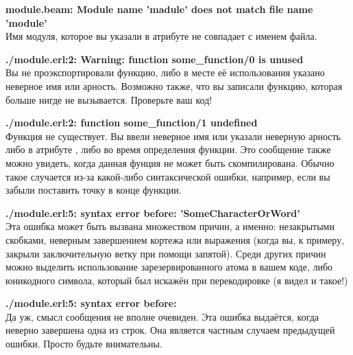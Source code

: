 \blankline
\begin{minipage}{\textwidth}
\textbf{module.beam: Module name 'madule' does not match file name 'module'}\\
Имя модуля, которое вы указали в атрибуте  не совпадает с именем файла.
\end{minipage}

\blankline
\begin{minipage}{\textwidth}
\textbf{./module.erl:2: Warning: function some\_function/0 is unused}\\ 
Вы не проэкспортировали функцию, либо в месте её использования указано неверное имя или арность.
Возможно также, что вы записали функцию, которая больше нигде не вызывается.
Проверьте ваш код!
\end{minipage}

\blankline
\begin{minipage}{\textwidth}
\textbf{./module.erl:2: function some\_function/1 undefined}\\ 
Функция не существует.
Вы ввели неверное имя или указали неверную арность либо в атрибуте , либо во время определения функции.
Это сообщение также можно увидеть, когда данная фунция не может быть скомпилирована.
Обычно такое случается из\--за какой\--либо синтаксической ошибки, например, если вы забыли поставить точку в конце функции.
\end{minipage}

\blankline
\begin{minipage}{\textwidth}
\textbf{./module.erl:5: syntax error before: 'SomeCharacterOrWord'}\\ 
Эта ошибка может быть вызвана множеством причин, а именно: незакрытыми скобками, неверным завершением кортежа или выражения (когда вы, к примеру, закрыли заключительную ветку  при помощи запятой).
Среди других причин можно выделить использование зарезервированного атома в вашем коде, либо юникодного символа, который был искажён при перекодировке (я видел и такое!)
\end{minipage}

\blankline
\begin{minipage}{\textwidth}
\textbf{./module.erl:5: syntax error before: }\\ 
Да уж, смысл сообщения не вполне очевиден.
Эта ошибка выдаётся, когда неверно завершена одна из строк.
Она является частным случаем предыдущей ошибки.
Просто будьте внимательны.
\end{minipage}

